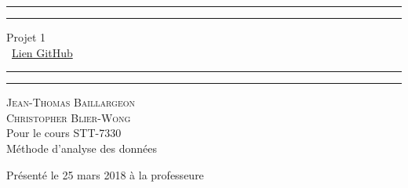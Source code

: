 \begin{titlepage}
	\centering %
	
	\scshape %
	
	\vspace*{\baselineskip} %
	
	
	\rule{\textwidth}{1.6pt}\vspace*{-\baselineskip}\vspace*{2pt} %
	\rule{\textwidth}{0.4pt} %
	
	\vspace{0.75\baselineskip} %
	
	{\LARGE Projet 1\\} %
	\ \href{https://github.com/chblw/stt7330-projet1}{Lien GitHub}
	\vspace{0.75\baselineskip} %
	
	\rule{\textwidth}{0.4pt}\vspace*{-\baselineskip}\vspace{3.2pt} %
	\rule{\textwidth}{1.6pt} %
	
	\vspace{2\baselineskip} %
	
	{\scshape\Large Jean-Thomas Baillargeon \\Christopher Blier-Wong\\} %
	Pour le cours STT-7330\\
	Méthode d'analyse des données \\%
	
	\vspace*{3\baselineskip} %
	
	
	Présenté le 25 mars 2018 à la professeure
	

\end{titlepage}
